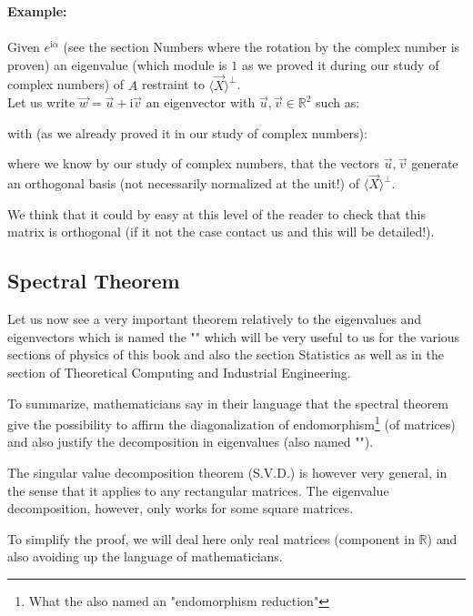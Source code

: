 	\begin{tcolorbox}[colframe=black,colback=white,sharp corners]
	\textbf{{\Large {}}Example:}\\\\
	Given $e^{\mathrm{i}\alpha}$ (see the section Numbers where the rotation by the complex number is proven) an eigenvalue (which module is $1$ as we proved it during our study of complex numbers) of $A$ restraint to $\langle \vec{X} \rangle^\perp$.\\
	
	Let us write $\vec{w}=\vec{u}+\mathrm{i}\vec{v}$ an eigenvector with $\vec{u},\vec{v}\in \mathbb{R}^2$ such as:
	
	with (as we already proved it in our study of complex numbers):
	
	where we know by our study of complex numbers, that the vectors $\vec{u},\vec{v}$ generate an orthogonal basis (not necessarily normalized at the unit!) of $\langle \vec{X} \rangle^\perp$.
	\begin{tcolorbox}[title=Remark,colframe=black,arc=10pt]
	We think that it could by easy at this level of the reader to check that this matrix is orthogonal (if it not the case contact us and this will be detailed!).
	\end{tcolorbox}
	\end{tcolorbox}
	
	\pagebreak
	\subsection{Spectral Theorem}\label{spectral theorem}
	Let us now see a very important theorem relatively to the eigenvalues and eigenvectors which is named the "" which will be very useful to us for the various sections of physics of this book and also the section  Statistics as well as in the section of Theoretical Computing and Industrial Engineering.
	
	To summarize, mathematicians say in their language that the spectral theorem give the possibility to affirm the diagonalization  of endomorphism\footnote{What the also named an "endomorphism reduction"} (of matrices) and also justify the decomposition in eigenvalues (also named "").
	\begin{tcolorbox}[title=Remark,colframe=black,arc=10pt]
	The singular value decomposition theorem (S.V.D.) is however very general, in the sense that it applies to any rectangular matrices. The eigenvalue decomposition, however, only works for some square matrices.
	\end{tcolorbox}
	To simplify the proof, we will deal here only real matrices (component in $\mathbb{R }$) and also avoiding up the language of mathematicians.
	
